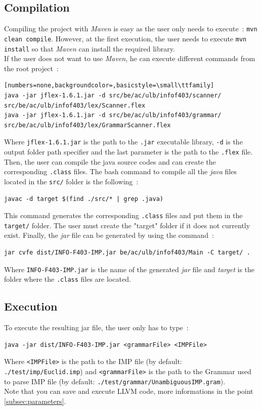 \documentclass[a4paper,11pt]{article}
\begin{document}
  \subsection{Compilation}
    Compiling the project with \textit{Maven} is easy as the user only needs to execute~: \verb|mvn clean compile|. However, at the first execution, the user needs to execute \verb|mvn install| so that \textit{Maven} can install the required library.\\
    If the user does not want to use \textit{Maven}, he can execute different commands from the root project~:
    \begin{lstlisting}[numbers=none,backgroundcolor=,basicstyle=\small\ttfamily]
java -jar jflex-1.6.1.jar -d src/be/ac/ulb/infof403/scanner/ src/be/ac/ulb/infof403/lex/Scanner.flex
java -jar jflex-1.6.1.jar -d src/be/ac/ulb/infof403/grammar/ src/be/ac/ulb/infof403/lex/GrammarScanner.flex
    \end{lstlisting}
    Where \verb|jflex-1.6.1.jar| is the path to the \verb|.jar| executable library,  \verb|-d| is the output folder path specifier and the last parameter is the path to the \verb|.flex| file.\\
    Then, the user can compile the java source codes and can create the corresponding \verb|.class| files. The bash command to compile all the \textit{java} files located in the \verb|src/| folder is the following~:
    \begin{verbatim}
javac -d target $(find ./src/* | grep .java)
    \end{verbatim}
    This command generates the corresponding \verb|.class| files and put them in the \verb|target/| folder. The user must create the "target" folder if it does not currently exist. Finally, the \textit{jar} file can be generated by using the command~:
    \begin{verbatim}
jar cvfe dist/INFO-F403-IMP.jar be/ac/ulb/infof403/Main -C target/ .
    \end{verbatim}
    Where \verb|INFO-F403-IMP.jar| is the name of the generated \textit{jar} file and \textit{target} is the folder where the \verb|.class| files are located.
    
  \subsection{Execution}
    To execute the resulting jar file, the user only has to type~:
    \begin{verbatim}
java -jar dist/INFO-F403-IMP.jar <grammarFile> <IMPFile>
    \end{verbatim}
    Where \verb|<IMPFile>| is the path to the IMP file (by default: \verb|./test/imp/Euclid.imp|) and \verb|<grammarFile>| is the path to the Grammar used to parse IMP file (by default: \verb|./test/grammar/UnambiguousIMP.gram|).\\
    Note that you can save and execute LLVM code, more informations in the point \ref{subsec:parameters}.
    
\end{document}
